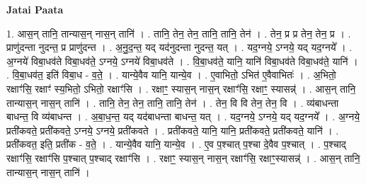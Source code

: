 \documentclass[17pt]{extarticle}
\begin{document}
\textbf{Jatai Paata} \newline

1. आस॒न् तानि॒ तान्यास॒न् नास॒न् तानि॑ । . तानि॒ तेन॒ तेन॒ तानि॒ तानि॒ तेन॑ । . तेन॒ प्र प्र तेन॒ तेन॒ प्र । . प्राणु॑दन्ता नुदन्त॒ प्र प्राणु॑दन्त । . अ॒नु॒द॒न्त॒ यद् यद॑नुदन्ता नुदन्त॒ यत् । . यद॒ग्नये॒ ऽग्नये॒ यद् यद॒ग्नये᳚ । . अ॒ग्नये॑ विबा॒धव॑ते विबा॒धव॑ते॒ ऽग्नये॒ ऽग्नये॑ विबा॒धव॑ते । . वि॒बा॒धव॑ते॒ यानि॒ यानि॑ विबा॒धव॑ते विबा॒धव॑ते॒ यानि॑ । . वि॒बा॒धव॑त॒ इति॑ विबा॒ध - व॒ते॒ । . यान्ये॒वैव यानि॒ यान्ये॒व । . ए॒वाभितो॒ ऽभित॑ ए॒वैवाभितः॑ । . अ॒भितो॒ रक्षाꣳ॑सि॒ रक्षाꣳ॑ स्य॒भितो॒ ऽभितो॒ रक्षाꣳ॑सि । . रक्षाꣳ॒॒ स्यास॒न् नास॒न् रक्षाꣳ॑सि॒ रक्षाꣳ॒॒ स्यासन्न्॑ । . आस॒न् तानि॒ तान्यास॒न् नास॒न् तानि॑ । . तानि॒ तेन॒ तेन॒ तानि॒ तानि॒ तेन॑ । . तेन॒ वि वि तेन॒ तेन॒ वि । . व्य॑बाधन्ता बाधन्त॒ वि व्य॑बाधन्त । . अ॒बा॒ध॒न्त॒ यद् यद॑बाधन्ता बाधन्त॒ यत् । . यद॒ग्नये॒ ऽग्नये॒ यद् यद॒ग्नये᳚ । . अ॒ग्नये॒ प्रती॑कवते॒ प्रती॑कवते॒ ऽग्नये॒ ऽग्नये॒ प्रती॑कवते । . प्रती॑कवते॒ यानि॒ यानि॒ प्रती॑कवते॒ प्रती॑कवते॒ यानि॑ । . प्रती॑कवत॒ इति॒ प्रती॑क - व॒ते॒ । . यान्ये॒वैव यानि॒ यान्ये॒व । . ए॒व प॒श्चात् प॒श्चा दे॒वैव प॒श्चात् । . प॒श्चाद् रक्षाꣳ॑सि॒ रक्षाꣳ॑सि प॒श्चात् प॒श्चाद् रक्षाꣳ॑सि । . रक्षाꣳ॒॒ स्यास॒न् नास॒न् रक्षाꣳ॑सि॒ रक्षाꣳ॒॒स्यासन्न्॑ । . आस॒न् तानि॒ तान्यास॒न् नास॒न् तानि॑ । \newline
\end{document}
